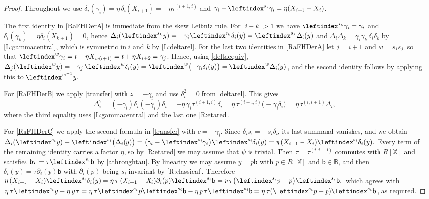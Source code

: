 \documentclass[a4paper,11pt]{amsart}
\numberwithin{equation}{subsection}
\theoremstyle{definition}
\theoremstyle{theorem}
\theoremstyle{remark}
\newcommand\bb{\mathsf{b}}
\newcommand\X{\mathbb{X}}
\newcommand{\Bo}{\mathbb{B}}
\begin{document}
\begin{proof}
  Throughout we use
  $\delta_i(\gamma_i)=\eta\,\delta_i(X_{i+1})=-\eta\tau^{(i+1,i)}$ and
  $\gamma_i-\leftindex^{s_i}\gamma_i=\eta(X_{i+1}-X_i)$.

  The first identity in \autoref{RaFHDerA} is immediate from the skew
  Leibniz rule. For $|i-k|>1$ we have $\leftindex^{s_k}\gamma_i=\gamma_i$
  and $\delta_i(\gamma_k)=\eta\delta_i(X_{k+1})=0$, hence
  $\Delta_i(\leftindex^{s_k}y)=-\gamma_i\leftindex^{s_k}\delta_i(y)=\leftindex^{s_k}\Delta_i(y)$
  and
  $\Delta_i\Delta_k=\gamma_i\gamma_k\,\delta_i\delta_k$ by
  \autoref{L:gammacentral}, which is symmetric in $i$ and $k$ by
  \autoref{L:deltarel}. For the last two identities in
  \autoref{RaFHDerA} let $j=i+1$ and $w=s_is_j$, so that
  $\leftindex^{w}\gamma_i= t+\eta X_{w(i+1)}=t+\eta X_{i+2}=\gamma_j$.
  Hence, using \autoref{deltaequiv},
  $\Delta_j(\leftindex^{w}y)=-\gamma_j\,\leftindex^{w}\delta_i(y)
    =\leftindex^{w}{\bigl(-\gamma_i\delta_i(y)\bigr)}=\leftindex^{w}\Delta_i(y)$,
  and the second identity follows by applying this to
  $\leftindex^{w^{-1}}y$.

  For \autoref{RaFHDerB} we apply \autoref{transfer} with $z=-\gamma_i$ and
  use $\delta_i^2=0$ from \autoref{deltarel}. This gives
  \[
    \Delta_i^2=(-\gamma_i)\delta_i(-\gamma_i)\delta_i
      =-\eta\,\gamma_i\tau^{(i+1,i)}\delta_i
      =\eta\,\tau^{(i+1,i)}\bigl(-\gamma_i\delta_i\bigr)
      =\eta\,\tau^{(i,i+1)}\Delta_i,
  \]
  where the third equality uses \autoref{L:gammacentral} and the last
  one \autoref{R:etared}.

  For \autoref{RaFHDerC} we apply the second formula in \autoref{transfer}
  with $c=-\gamma_i$. Since   $\delta_is_i=-s_i\delta_i$,  its  last summand vanishes, and we obtain
  $
    \Delta_i(\leftindex^{s_i}y)+\leftindex^{s_i}{\bigl(\Delta_i(y)\bigr)}
      =\bigl(\gamma_i-\leftindex^{s_i}\gamma_i\bigr)\leftindex^{s_i}\delta_i(y)
      =\eta\,(X_{i+1}-X_i)\leftindex^{s_i}\delta_i(y).
  $
  Every term of the remaining identity carries a factor $\eta$, so by
  \autoref{R:etared} we may assume that $\psi$ is trivial. Then
  $\tau=\tau^{(i,i+1)}$ commutes with $R[\X]$ and satisfies
  $\bb\tau=\tau\leftindex^{s_i}\bb$ by \autoref{athroughtau}. By
  linearity we may assume $y=p\bb$ with $p\in R[\X]$ and $\bb\in\Bo$,
  and then $\delta_i(y)=\tau\partial_i(p)\bb$ with $\partial_i(p)$
  being $s_i$-invariant by \autoref{R:classical}. Therefore
  $
    \eta\,(X_{i+1}-X_i)\leftindex^{s_i}\delta_i(y)
      =\eta\,\tau\,(X_{i+1}-X_i)\partial_i(p)\leftindex^{s_i}\bb
      =\eta\,\tau\bigl(\leftindex^{s_i}p-p\bigr)\leftindex^{s_i}\bb,
  $
  which agrees with
  $\eta\,\tau\leftindex^{s_i}y-\eta\,y\,\tau
    =\eta\,\tau\leftindex^{s_i}p\leftindex^{s_i}\bb-\eta\,p\,\tau\leftindex^{s_i}\bb
    =\eta\,\tau(\leftindex^{s_i}p-p)\leftindex^{s_i}\bb$, as required.


\end{proof}
\end{document}
